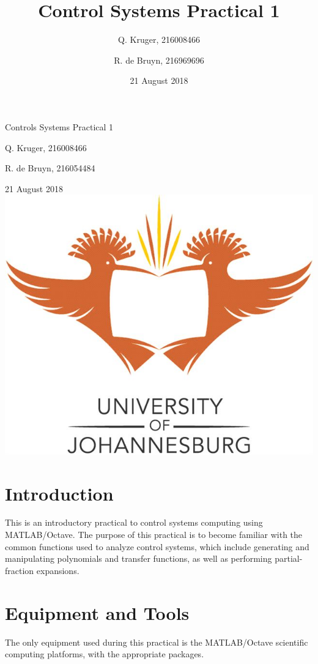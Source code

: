 \documentclass[12pt, a4paper]{article}
\title{Control Systems Practical 1}
\date{21 August 2018}
\author{Q. Kruger, 216008466 \and R. de Bruyn, 216969696}
\begin{document}
	\begin{titlepage}
		\centering
		{\LARGE Controls Systems Practical 1 \par}
		\vspace*{1.5cm}
		{\large Q. Kruger, 216008466 \par}
		{\large R. de Bruyn, 216054484 \par}
		\vspace*{1.2cm}
		{\large 21 August 2018}
		\vspace*{\fill}
		\includegraphics[width=\textwidth]{img/UJ.jpg}
		\vspace*{\fill}
	\end{titlepage}
	\tableofcontents
	\newpage
	
	\section{Introduction} %
	\label{sec:introduction}
		This is an introductory practical to control systems computing using MATLAB/Octave. The purpose of this practical is to become familiar with the common functions used to analyze control systems, which include generating and manipulating polynomials and transfer functions, as well as performing partial-fraction expansions.

	\section{Equipment and Tools} %
	\label{sec:equipment_and_tools}
		The only equipment used during this practical is the MATLAB/Octave scientific computing platforms, with the appropriate packages.
\end{document}
